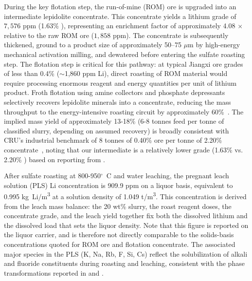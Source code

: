 \documentclass{article}
\renewcommand\_{\textunderscore\allowbreak}
\begin{document}
During the key flotation step, the run-of-mine (ROM) ore is upgraded into an intermediate lepidolite concentrate. This concentrate yields a lithium grade of $7,576$ ppm (1.63\% ), representing an enrichment factor of approximately 4.08 $\times$ relative to the raw ROM ore ($1,858$ ppm). The concentrate is subsequently thickened, ground to a product size of approximately 50--75 $\mu$m by high-energy mechanical activation milling, and dewatered before entering the sulfate roasting step. The flotation step is critical for this pathway: at typical Jiangxi ore grades of less than 0.4\%  ($\sim$1,860 ppm Li), direct roasting of ROM material would require processing enormous reagent and energy quantities per unit of lithium product. Froth flotation using amine collectors and phosphate depressants selectively recovers lepidolite minerals into a concentrate, reducing the mass throughput to the energy-intensive roasting circuit by approximately 60\%~\cite{jiaoKeyTechnologiesDevelopment2024}. The implied mass yield of approximately 13-18\% (6-8 tonnes feed per tonne of classified slurry, depending on assumed recovery) is broadly consistent with CRU's industrial benchmark of 8 tonnes of 0.40\%  ore per tonne of 2.20\%  concentrate~\cite{fisherScrutinisingLithiumTechnology2022}, noting that our intermediate is a relatively lower grade (1.63\% vs. 2.20\% ) based on reporting from \citet{garrettHandbookLithiumNatural2004}.

After sulfate roasting at 800-950$^\circ$~C and water leaching, the pregnant leach solution (PLS) Li concentration is 909.9 ppm on a liquor basis, equivalent to 0.995 \si{kg~Li/m^3} at a solution density of 1.049 \si{t/m^3}. This concentration is derived from the leach mass balance: the 20 wt\% slurry, the roast reagent doses, the concentrate grade, and the leach yield together fix both the dissolved lithium and the dissolved load that sets the liquor density. Note that this figure is reported on the liquor carrier, and is therefore not directly comparable to the solids-basis concentrations quoted for ROM ore and flotation concentrate. The associated major species in the PLS (K, Na, Rb, F, Si, Cs) reflect the solubilization of alkali and fluoride constituents during roasting and leaching, consistent with the phase transformations reported in \citet{yanExtractionLithiumLepidolite2012} and \citet{dengSystematicReviewSulfate2026}.
\end{document}

